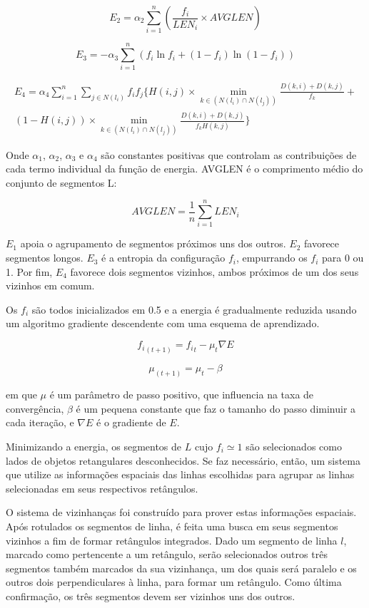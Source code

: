 \begin{equation}
E_2 = \alpha _2 {\sum_{i=1}^{n} (\frac{f_i}{LEN_i}\times AVGLEN)}  \label{e2}
\end{equation}

\begin{equation}
E_3 = -\alpha _3 {\sum_{i=1}^{n} (f_i \ln f_i + (1-f_i)\ln(1-f_i))} \label{e3}
\end{equation}

\begin{align}
E_4 = \alpha_4 \sum_{i=1}^{n} \sum_ {j\in N(l_i)}^{}f_if_j \{ H(i,j)\times \min_{k\in (N(l_i)\cap N(l_j))} \frac{D(k,i)+D(k,j)}{f_k} +\\ \nonumber
(1-H(i,j))\times \min_{k\in (N(l_i)\cap N(l_j))} \frac{D(k,i)+D(k,j)}{f_kH(k,j)} \}
\label{e4}
\end{align}

Onde $ \alpha _1 $, $ \alpha _2 $, $ \alpha _3 $ e $ \alpha _4 $ são constantes positivas que controlam as contribuições de cada termo individual da função de energia. AVGLEN é o comprimento médio do conjunto de segmentos L:
	
$$ AVGLEN = \frac{1}{n} \displaystyle \sum_{i=1}^{n} LEN_i $$

$E_1$ apoia o agrupamento de segmentos próximos uns dos outros. $E_2$ favorece segmentos longos. $E_3$ é a entropia da configuração ${f_i}$, empurrando os ${f_i}$ para 0 ou 1. Por fim, $E_4$ favorece dois segmentos vizinhos, ambos próximos de um dos seus vizinhos em comum.

Os $ {f_i} $ são todos inicializados em 0.5 e a energia é gradualmente reduzida usando um algoritmo gradiente descendente com uma esquema de aprendizado.

$$ {f_i}_{(t+1)} = {f_i}_t - \mu_t \nabla E $$

$$ \mu_{(t+1)} = \mu_t - \beta $$

em que $\mu$ é um parâmetro de passo positivo, que influencia na taxa de convergência, $\beta$ é um pequena constante que faz o tamanho do passo diminuir a cada iteração, e $ \nabla E $ é o gradiente de $E$.

Minimizando a energia, os segmentos de $L$ cujo $f_i \simeq 1$ são selecionados como lados de objetos retangulares desconhecidos. Se faz necessário, então, um sistema que utilize as informações espaciais das linhas escolhidas para agrupar as linhas selecionadas em seus respectivos retângulos.

O sistema de vizinhanças foi construído para prover estas informações espaciais. Após rotulados os segmentos de linha, é feita uma busca em seus segmentos vizinhos a fim de formar retângulos integrados. Dado um segmento de linha $l$, marcado como pertencente a um retângulo, serão selecionados outros três segmentos também marcados da sua vizinhança, um dos quais será paralelo e os outros dois perpendiculares à linha, para formar um retângulo. Como última confirmação, os três segmentos devem ser vizinhos uns dos outros.

